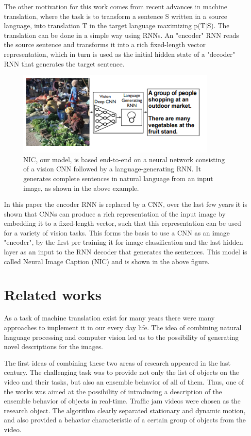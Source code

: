 \documentclass[a4paper,UKenglish,cleveref, autoref, thm-restate]{lipics-v2021}
\begin{document}
The other motivation for this work comes from recent advances in machine translation, where the task is to transform a sentence S written in a source language, into translation T in the target language maximizing p(T|S).
The translation can be done in a simple way using RNNs. An "encoder" RNN reads the source sentence and transforms it into a rich fixed-length vector representation, which in turn is used as the initial hidden state of a "decoder" RNN that generates the target sentence.
\begin{figure}[ht]
    \centering
    \includegraphics[width=10cm]{images/NIC_Basic_Model.png}
    \caption{NIC, our model, is based end-to-end on a neural network consisting of a vision CNN followed by a language-generating RNN. It generates complete sentences in natural language from an input image, as shown in the above example.}
    \label{fig:}
\end{figure}

In this paper the encoder RNN is replaced by a CNN, over the last few years it is shown that CNNs can produce a rich representation of the input image by embedding it to a fixed-length vector, such that this representation can be used for a variety of vision tasks. This forms the basis to use a CNN as an image "encoder", by the first pre-training it for image classification and the last hidden layer as an input to the RNN decoder that generates the sentences. This model is called Neural Image Caption (NIC) and is shown in the above figure.

\section{Related works}
\label{related works}
As a task of machine translation exist for many years there were many approaches to implement it in our every day life. The idea of combining natural language processing and computer vision led us to the possibility of generating novel descriptions for the images.

The first ideas of combining these two areas of research appeared in the last century. The challenging task was to provide not only the list of objects on the video and their tasks, but also an ensemble behavior of all of them.  Thus, one of the works was aimed at the possibility of introducing a description of the ensemble behavior of objects in real-time. Traffic jam videos were chosen as the research object. The algorithm clearly separated stationary and dynamic motion, and also provided a behavior characteristic of a certain group of objects from the video.
\end{document}
